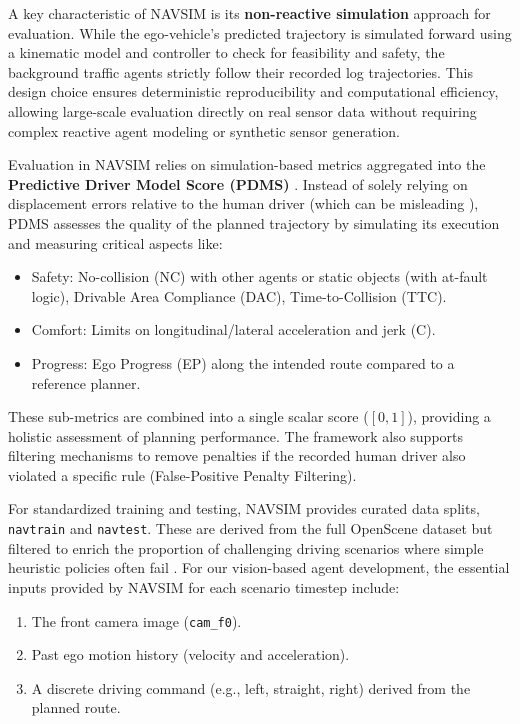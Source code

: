 \documentclass{article}
\begin{document}
A key characteristic of NAVSIM is its \textbf{non-reactive simulation} approach for evaluation. While the ego-vehicle's predicted trajectory is simulated forward using a kinematic model and controller to check for feasibility and safety, the background traffic agents strictly follow their recorded log trajectories. This design choice ensures deterministic reproducibility and computational efficiency, allowing large-scale evaluation directly on real sensor data without requiring complex reactive agent modeling or synthetic sensor generation.

Evaluation in NAVSIM relies on simulation-based metrics aggregated into the \textbf{Predictive Driver Model Score (PDMS)} \cite{dauner2024navsim, hallgarten2023pdm}. Instead of solely relying on displacement errors relative to the human driver (which can be misleading \cite{zhairet2023rethinking}), PDMS assesses the quality of the planned trajectory by simulating its execution and measuring critical aspects like:
\begin{itemize}
    \item Safety: No-collision (NC) with other agents or static objects (with at-fault logic), Drivable Area Compliance (DAC), Time-to-Collision (TTC).
    \item Comfort: Limits on longitudinal/lateral acceleration and jerk (C).
    \item Progress: Ego Progress (EP) along the intended route compared to a reference planner.
\end{itemize}
These sub-metrics are combined into a single scalar score ($[0, 1]$), providing a holistic assessment of planning performance. The framework also supports filtering mechanisms to remove penalties if the recorded human driver also violated a specific rule (False-Positive Penalty Filtering).

For standardized training and testing, NAVSIM provides curated data splits, \texttt{navtrain} and \texttt{navtest}. These are derived from the full OpenScene dataset but filtered to enrich the proportion of challenging driving scenarios where simple heuristic policies often fail \cite{dauner2024navsim}. For our vision-based agent development, the essential inputs provided by NAVSIM for each scenario timestep include:
\begin{enumerate}
    \item The front camera image (\texttt{cam\_f0}).
    \item Past ego motion history (velocity and acceleration).
    \item A discrete driving command (e.g., left, straight, right) derived from the planned route.
\end{enumerate}
\end{document}
